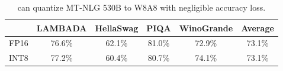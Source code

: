 \begin{table}[h]
    \setlength{\tabcolsep}{3pt}
    \small
    \centering
    \caption{\method can quantize MT-NLG 530B to W8A8 with negligible accuracy loss.}
    \begin{tabular}{lccccc}
        \toprule
        & {LAMBADA} & {HellaSwag} & {PIQA} & {WinoGrande} & Average  \\
         \midrule 
        FP16  & 76.6\% & 62.1\% & 81.0\% & 72.9\% & 73.1\%         \\ 
         INT8 & 77.2\% & 60.4\%  & 80.7\% & 74.1\% & 73.1\%  \\
        \bottomrule
    \end{tabular}
    \vspace{-10pt}
    \label{tab:530b_acc}
\end{table}
